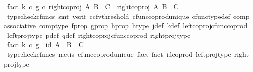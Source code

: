 \begin{isabellebody}
\ fact{}{\isacharcolon}{\kern0pt}\ {\isachardoublequoteopen}{\isacharparenleft}{\kern0pt}k\ {\isasymcirc}\isactrlsub c\ g{\isacharparenright}{\kern0pt}\ {\isasymcirc}\isactrlsub c\ {\isacharparenleft}{\kern0pt}right{\isacharunderscore}{\kern0pt}coproj\ A\ {\isacharparenleft}{\kern0pt}B\ {\isasymCoprod}\ C{\isacharparenright}{\kern0pt}{\isacharparenright}{\kern0pt}\ {\isacharequal}{\kern0pt}\ {\isacharparenleft}{\kern0pt}right{\isacharunderscore}{\kern0pt}coproj\ A\ {\isacharparenleft}{\kern0pt}B\ {\isasymCoprod}\ C{\isacharparenright}{\kern0pt}{\isacharparenright}{\kern0pt}{\isachardoublequoteclose}\isanewline
\ \ \ \ \isamarkupfalse%
\ {\isacharparenleft}{\kern0pt}typecheck{\isacharunderscore}{\kern0pt}cfuncs{\isacharcomma}{\kern0pt}\ smt\ {\isacharparenleft}{\kern0pt}verit{\isacharcomma}{\kern0pt}\ ccfv{\isacharunderscore}{\kern0pt}threshold{\isacharparenright}{\kern0pt}\ cfunc{\isacharunderscore}{\kern0pt}coprod{\isacharunderscore}{\kern0pt}unique\ cfunc{\isacharunderscore}{\kern0pt}type{\isacharunderscore}{\kern0pt}def\ comp{\isacharunderscore}{\kern0pt}associative\ comp{\isacharunderscore}{\kern0pt}type\ f{\isacharunderscore}{\kern0pt}prop\ g{\isacharunderscore}{\kern0pt}prop\ h{\isacharunderscore}{\kern0pt}prop{}\ h{\isacharunderscore}{\kern0pt}type\ j{\isacharunderscore}{\kern0pt}def\ k{\isacharunderscore}{\kern0pt}def\ left{\isacharunderscore}{\kern0pt}coproj{\isacharunderscore}{\kern0pt}cfunc{\isacharunderscore}{\kern0pt}coprod\ left{\isacharunderscore}{\kern0pt}proj{\isacharunderscore}{\kern0pt}type\ p{\isacharunderscore}{\kern0pt}def\ q{\isacharunderscore}{\kern0pt}def\ right{\isacharunderscore}{\kern0pt}coproj{\isacharunderscore}{\kern0pt}cfunc{\isacharunderscore}{\kern0pt}coprod\ right{\isacharunderscore}{\kern0pt}proj{\isacharunderscore}{\kern0pt}type{\isacharparenright}{\kern0pt}\isanewline
\ \ \isamarkupfalse%
\ fact{}{\isacharcolon}{\kern0pt}\ {\isachardoublequoteopen}{\isacharparenleft}{\kern0pt}k\ {\isasymcirc}\isactrlsub c\ g{\isacharparenright}{\kern0pt}\ {\isacharequal}{\kern0pt}\ id{\isacharparenleft}{\kern0pt}\ A\ {\isasymCoprod}\ {\isacharparenleft}{\kern0pt}B\ {\isasymCoprod}\ C{\isacharparenright}{\kern0pt}{\isacharparenright}{\kern0pt}{\isachardoublequoteclose}\isanewline
\ \ \ \ \isamarkupfalse%
\ {\isacharparenleft}{\kern0pt}typecheck{\isacharunderscore}{\kern0pt}cfuncs{\isacharcomma}{\kern0pt}\ metis\ cfunc{\isacharunderscore}{\kern0pt}coprod{\isacharunderscore}{\kern0pt}unique\ fact{}\ fact{}\ id{\isacharunderscore}{\kern0pt}coprod\ left{\isacharunderscore}{\kern0pt}proj{\isacharunderscore}{\kern0pt}type\ right{\isacharunderscore}{\kern0pt}proj{\isacharunderscore}{\kern0pt}type{\isacharparenright}{\kern0pt}\isanewline

\end{isabellebody}
